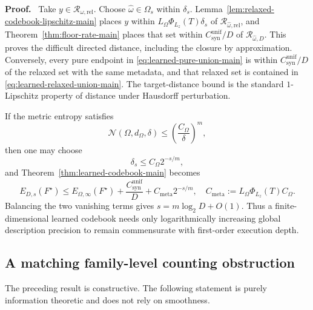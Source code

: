 \documentclass[twoside,11pt]{article}
\renewenvironment{proof}[1][Proof]{\par\noindent\textbf{#1.}\ }{\hfill\BlackBox\par\medskip}
\newcommand{\Rel}{\mathrm{rel}}
\newcommand{\RR}{\mathscr{R}}
\begin{document}
\begin{proof}
Take $y\in\RR_{\omega,\Rel}$.  Choose $\widehat\omega\in\Omega_s$ within $\delta_s$.  Lemma~\ref{lem:relaxed-codebook-lipschitz-main} places $y$ within $L_\Omega\Phi_{L_z}(T)\delta_s$ of $\RR_{\widehat\omega,\Rel}$, and Theorem~\ref{thm:floor-rate-main} places that set within $C_{\mathrm{syn}}^{\mathrm{unif}}/D$ of $\RR_{\widehat\omega,D}$.  This proves the difficult directed distance, including the closure by approximation.  Conversely, every pure endpoint in \eqref{eq:learned-pure-union-main} is within $C_{\mathrm{syn}}^{\mathrm{unif}}/D$ of the relaxed set with the same metadata, and that relaxed set is contained in \eqref{eq:learned-relaxed-union-main}.  The target-distance bound is the standard $1$-Lipschitz property of distance under Hausdorff perturbation.
\end{proof}

If the metric entropy satisfies
\begin{equation}
 \mathcal N(\Omega,d_\Omega,\delta)
 \le\left(\frac{C_\Omega}{\delta}\right)^m,
 \label{eq:metadata-entropy-main}
\end{equation}
then one may choose
\begin{equation}
 \delta_s\le C_\Omega2^{-s/m},
 \label{eq:metadata-radius-main}
\end{equation}
and Theorem~\ref{thm:learned-codebook-main} becomes
\begin{equation}
 E_{D,s}(F^\star)
 \le E_{\Omega,\infty}(F^\star)
 +\frac{C_{\mathrm{syn}}^{\mathrm{unif}}}{D}
 +C_{\mathrm{meta}}2^{-s/m},
 \quad
 C_{\mathrm{meta}}:=L_\Omega\Phi_{L_z}(T)C_\Omega.
 \label{eq:metadata-bit-law-main}
\end{equation}
Balancing the two vanishing terms gives $s=m\log_2D+O(1)$.  Thus a finite-dimensional learned codebook needs only logarithmically increasing global description precision to remain commensurate with first-order execution depth.

\subsection{A matching family-level counting obstruction}
\label{sec:metadata-converse-main}

The preceding result is constructive.  The following statement is purely information theoretic and does not rely on smoothness.
\end{document}
